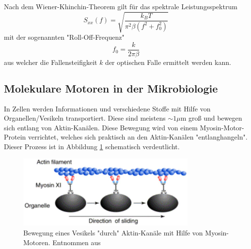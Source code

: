     Nach dem Wiener-Khinchin-Theorem gilt für das spektrale Leistungsspektrum
    \begin{equation}
      S_{xx}(f) = \sqrt{\frac{k_B T}{\pi^2\beta(f^2+f_0^2)}}
      \label{eqn:Leistung}
    \end{equation}
    mit der sogenannten "Roll-Off-Frequenz"
    \begin{equation}
      f_0 = \frac{k}{2\pi\beta}
      \label{eqn:Roll}
    \end{equation}
    aus welcher die Fallensteifigkeit $k$ der optischen Falle ermittelt werden kann.
  \subsection{Molekulare Motoren in der Mikrobiologie}
    In Zellen werden Informationen und verschiedene Stoffe mit Hilfe von Organellen/Vesikeln transportiert. Diese sind meistens $\sim 1\mu\text{m}$ groß und bewegen sich entlang von Aktin-Kanälen. Diese Bewegung wird von einem Myosin-Motor-Protein verrichtet, welches sich praktisch an den Aktin-Kanälen "entlanghangeln". Dieser Prozess ist in Abbildung \ref{fig:Motor} schematisch verdeutlicht.
    \begin{figure}[h]
      \centering
      \includegraphics[width = 0.8\textwidth]{pictures/Motor.png}
      \caption{Bewegung eines Vesikels "durch" Aktin-Kanäle mit Hilfe von Myosin-Motoren. Entnommen aus \cite{tu_dortmund_versuchsanleitung_OptischePinzette}}
      \label{fig:Motor}
    \end{figure}
    